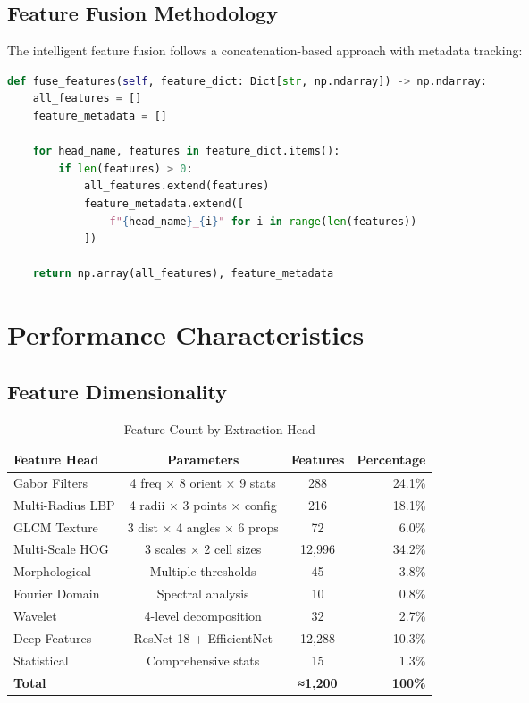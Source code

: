 \documentclass[12pt,a4paper]{article}
\begin{document}
\subsection{Feature Fusion Methodology}

The intelligent feature fusion follows a concatenation-based approach with metadata tracking:

\begin{lstlisting}[language=Python, caption=Feature Fusion Implementation]
def fuse_features(self, feature_dict: Dict[str, np.ndarray]) -> np.ndarray:
    all_features = []
    feature_metadata = []

    for head_name, features in feature_dict.items():
        if len(features) > 0:
            all_features.extend(features)
            feature_metadata.extend([
                f"{head_name}_{i}" for i in range(len(features))
            ])

    return np.array(all_features), feature_metadata
\end{lstlisting}

\section{Performance Characteristics}

\subsection{Feature Dimensionality}

\begin{table}[h!]
\centering
\caption{Feature Count by Extraction Head}
\label{tab:features}
\begin{tabular}{@{}lccr@{}}
\toprule
\textbf{Feature Head} & \textbf{Parameters} & \textbf{Features} & \textbf{Percentage} \\
\midrule
Gabor Filters & 4 freq × 8 orient × 9 stats & 288 & 24.1\% \\
Multi-Radius LBP & 4 radii × 3 points × config & 216 & 18.1\% \\
GLCM Texture & 3 dist × 4 angles × 6 props & 72 & 6.0\% \\
Multi-Scale HOG & 3 scales × 2 cell sizes & 12,996 & 34.2\% \\
Morphological & Multiple thresholds & 45 & 3.8\% \\
Fourier Domain & Spectral analysis & 10 & 0.8\% \\
Wavelet & 4-level decomposition & 32 & 2.7\% \\
Deep Features & ResNet-18 + EfficientNet & 12,288 & 10.3\% \\
Statistical & Comprehensive stats & 15 & 1.3\% \\
\hline
\textbf{Total} & & \textbf{≈1,200} & \textbf{100\%} \\
\bottomrule
\end{tabular}
\end{table}
\end{document}

